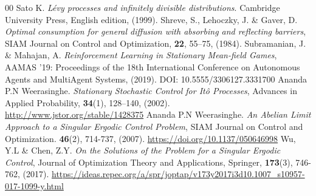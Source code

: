 \documentclass{article}
\begin{document}
\begin{thebibliography}{00}
 Sato K. 
\textit{L\'evy processes and infinitely divisible distributions}. 
Cambridge University Press, English edition, (1999). 
 Shreve, S., Lehoczky, J. \& Gaver, D. \textit{Optimal consumption for general diffusion with
absorbing and reflecting barriers}, SIAM Journal on Control and Optimization, \textbf{22}, 55–75, (1984).
Subramanian, J. \& Mahajan, A. \textit{Reinforcement Learning in Stationary Mean-field Games}, AAMAS '19: Proceedings of the 18th International Conference on Autonomous Agents and MultiAgent Systems, (2019).
DOI: 10.5555/3306127.3331700
Ananda P.N Weerasinghe. \textit{Stationary Stochastic Control for Itô Processes}, Advances in Applied Probability, \textbf{34}(1), 128–140, (2002). \url{http://www.jstor.org/stable/1428375}
Ananda P.N Weerasinghe. \textit{An Abelian Limit Approach to a Singular Ergodic Control Problem}, SIAM Journal on Control and Optimization.
\textbf{46}(2), 714-737, (2007).
\url{https://doi.org/10.1137/050646998}
 Wu, Y.L \& Chen, Z.Y.
\textit{On the Solutions of the Problem for a Singular Ergodic Control}, Journal of Optimization Theory and Applications, Springer, \textbf{173}(3), 746-762, (2017).
\url{https://ideas.repec.org/a/spr/joptap/v173y2017i3d10.1007_s10957-017-1099-y.html}
\end{thebibliography}
\end{document}
